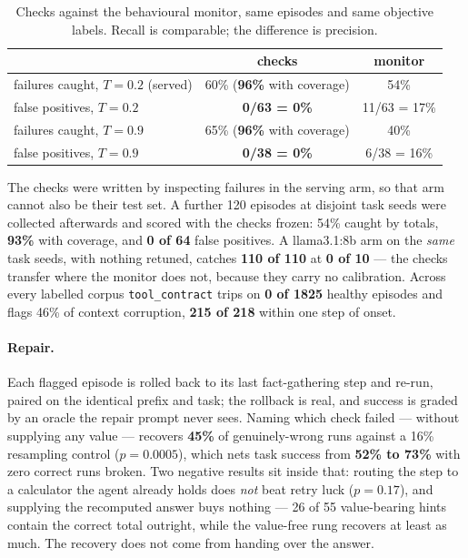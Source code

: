 \documentclass{article}
\begin{document}
\begin{table}[h]
\centering
\caption{Checks against the behavioural monitor, same episodes and same
objective labels. Recall is comparable; the difference is precision.}
\label{tab:verify}
\begin{tabular}{lcc}
\toprule
 & checks & monitor \\
\midrule
failures caught, $T{=}0.2$ (served) & 60\% (\textbf{96\%} with coverage) & 54\% \\
false positives, $T{=}0.2$ & \textbf{0/63 = 0\%} & 11/63 = 17\% \\
failures caught, $T{=}0.9$ & 65\% (\textbf{96\%} with coverage) & 40\% \\
false positives, $T{=}0.9$ & \textbf{0/38 = 0\%} & 6/38 = 16\% \\
\bottomrule
\end{tabular}
\end{table}

The checks were written by inspecting failures in the serving arm, so that arm
cannot also be their test set. A further 120 episodes at disjoint task seeds
were collected afterwards and scored with the checks frozen: 54\% caught by
totals, \textbf{93\%} with coverage, and \textbf{0 of 64} false positives. A
llama3.1:8b arm on the \emph{same} task seeds, with nothing retuned, catches
\textbf{110 of 110} at \textbf{0 of 10} --- the checks transfer where the monitor
does not, because they carry no calibration. Across every labelled corpus
\texttt{tool\_contract} trips on \textbf{0 of 1825} healthy episodes and flags
46\% of context corruption, \textbf{215 of 218} within one step of onset.

\paragraph{Repair.} Each flagged episode is rolled back to its last
fact-gathering step and re-run, paired on the identical prefix and task; the
rollback is real, and success is graded by an oracle the repair prompt never
sees. Naming which check failed --- without supplying any value --- recovers
\textbf{45\%} of genuinely-wrong runs against a 16\% resampling control
($p=0.0005$), which nets task success from \textbf{52\% to 73\%} with zero
correct runs broken. Two negative results sit inside that: routing the step to
a calculator the agent already holds does \emph{not} beat retry luck
($p=0.17$), and supplying the recomputed answer buys nothing --- 26 of 55
value-bearing hints contain the correct total outright, while the value-free
rung recovers at least as much. The recovery does not come from handing over
the answer.
\end{document}

